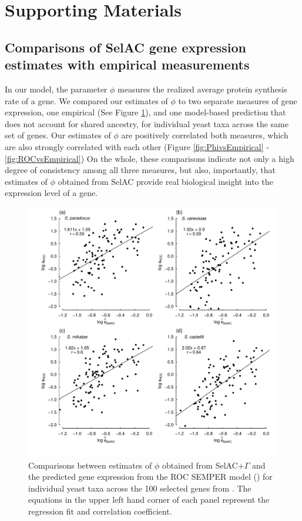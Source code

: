\documentclass{article}
\newcommand{\selacplusgamma}{SelAC$+\Gamma$\xspace}
\begin{document}
\section*{Supporting Materials}

\subsection*{Comparisons of SelAC gene expression estimates with empirical measurements}

In our model, the parameter $\phi$ measures the realized average protein synthesis rate of a gene. 
We compared our estimates of $\phi$ to two separate measures of gene expression, one empirical (See Figure \ref{fig:PhivsROC}), and one model-based prediction that does not account for shared ancestry, for individual yeast taxa across the same set of genes. 
Our estimates of $\phi$ are positively correlated both measures, which are also strongly correlated with each other (Figure \ref{fig:PhivsEmpirical} - \ref{fig:ROCvsEmpirical}) 
On the whole, these comparisons indicate not only a high degree of consistency among all three measures, but also, importantly, that estimates of $\phi$ obtained from SelAC provide real biological insight into the expression level of a gene.

\begin{figure}[H]
  \centering
  \includegraphics[width=0.9\linewidth]{FIGURE_S1_SelACwG_vs_ROC_by_spp.pdf}
  \caption{Comparisons between estimates of $\phi$ obtained from \selacplusgamma and the predicted gene expression from the ROC SEMPER model (\citet{GilchristEtAl2015}) for individual yeast taxa across the 100 selected genes from \citet{SalichosAndRokas2013}.
  The equations in the upper left hand corner of each panel represent the regression fit and correlation coefficient.
  } 
  \label{fig:PhivsROC}
\end{figure}
\end{document}

